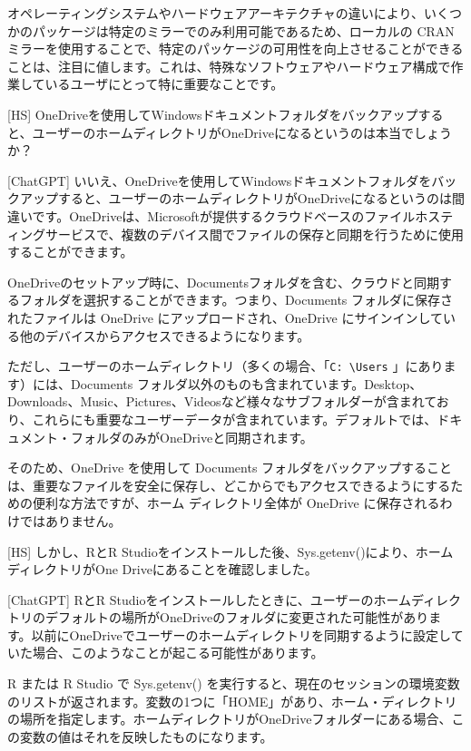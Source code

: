 \documentclass[
]{bxjsbook}
\theoremstyle{definition}
\theoremstyle{definition}
\theoremstyle{definition}
\theoremstyle{definition}
\theoremstyle{remark}
\begin{document}
オペレーティングシステムやハードウェアアーキテクチャの違いにより、いくつかのパッケージは特定のミラーでのみ利用可能であるため、ローカルの CRAN ミラーを使用することで、特定のパッケージの可用性を向上させることができることは、注目に値します。これは、特殊なソフトウェアやハードウェア構成で作業しているユーザにとって特に重要なことです。

{[}HS{]} OneDriveを使用してWindowsドキュメントフォルダをバックアップすると、ユーザーのホームディレクトリがOneDriveになるというのは本当でしょうか？

{[}ChatGPT{]} いいえ、OneDriveを使用してWindowsドキュメントフォルダをバックアップすると、ユーザーのホームディレクトリがOneDriveになるというのは間違いです。OneDriveは、Microsoftが提供するクラウドベースのファイルホスティングサービスで、複数のデバイス間でファイルの保存と同期を行うために使用することができます。

OneDriveのセットアップ時に、Documentsフォルダを含む、クラウドと同期するフォルダを選択することができます。つまり、Documents フォルダに保存されたファイルは OneDrive にアップロードされ、OneDrive にサインインしている他のデバイスからアクセスできるようになります。

ただし、ユーザーのホームディレクトリ（多くの場合、「\texttt{C:\ \textbackslash{}Users} 」にあります）には、Documents フォルダ以外のものも含まれています。Desktop、Downloads、Music、Pictures、Videosなど様々なサブフォルダーが含まれており、これらにも重要なユーザーデータが含まれています。デフォルトでは、ドキュメント・フォルダのみがOneDriveと同期されます。

そのため、OneDrive を使用して Documents フォルダをバックアップすることは、重要なファイルを安全に保存し、どこからでもアクセスできるようにするための便利な方法ですが、ホーム ディレクトリ全体が OneDrive に保存されるわけではありません。

{[}HS{]} しかし、RとR Studioをインストールした後、Sys.getenv()により、ホームディレクトリがOne Driveにあることを確認しました。

{[}ChatGPT{]} RとR Studioをインストールしたときに、ユーザーのホームディレクトリのデフォルトの場所がOneDriveのフォルダに変更された可能性があります。以前にOneDriveでユーザーのホームディレクトリを同期するように設定していた場合、このようなことが起こる可能性があります。

R または R Studio で Sys.getenv() を実行すると、現在のセッションの環境変数のリストが返されます。変数の1つに「HOME」があり、ホーム・ディレクトリの場所を指定します。ホームディレクトリがOneDriveフォルダーにある場合、この変数の値はそれを反映したものになります。
\end{document}
